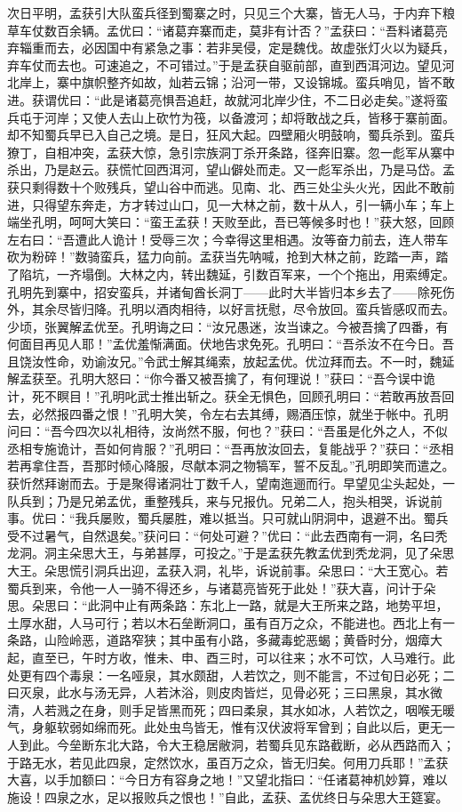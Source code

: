 次日平明，孟获引大队蛮兵径到蜀寨之时，只见三个大寨，皆无人马，于内弃下粮草车仗数百余辆。孟优曰：“诸葛弃寨而走，莫非有计否？”孟获曰：“吾料诸葛亮弃辎重而去，必因国中有紧急之事：若非吴侵，定是魏伐。故虚张灯火以为疑兵，弃车仗而去也。可速追之，不可错过。”于是孟获自驱前部，直到西洱河边。望见河北岸上，寨中旗帜整齐如故，灿若云锦；沿河一带，又设锦城。蛮兵哨见，皆不敢进。获谓优曰：“此是诸葛亮惧吾追赶，故就河北岸少住，不二日必走矣。”遂将蛮兵屯于河岸；又使人去山上砍竹为筏，以备渡河；却将敢战之兵，皆移于寨前面。却不知蜀兵早已入自己之境。是日，狂风大起。四壁厢火明鼓响，蜀兵杀到。蛮兵獠丁，自相冲突，孟获大惊，急引宗族洞丁杀开条路，径奔旧寨。忽一彪军从寨中杀出，乃是赵云。获慌忙回西洱河，望山僻处而走。又一彪军杀出，乃是马岱。孟获只剩得数十个败残兵，望山谷中而逃。见南、北、西三处尘头火光，因此不敢前进，只得望东奔走，方才转过山口，见一大林之前，数十从人，引一辆小车；车上端坐孔明，呵呵大笑曰：“蛮王孟获！天败至此，吾已等候多时也！”获大怒，回顾左右曰：“吾遭此人诡计！受辱三次；今幸得这里相遇。汝等奋力前去，连人带车砍为粉碎！”数骑蛮兵，猛力向前。孟获当先呐喊，抢到大林之前，趷踏一声，踏了陷坑，一齐塌倒。大林之内，转出魏延，引数百军来，一个个拖出，用索缚定。孔明先到寨中，招安蛮兵，并诸甸酋长洞丁——此时大半皆归本乡去了——除死伤外，其余尽皆归降。孔明以酒肉相待，以好言抚慰，尽令放回。蛮兵皆感叹而去。少顷，张翼解孟优至。孔明诲之曰：“汝兄愚迷，汝当谏之。今被吾擒了四番，有何面目再见人耶！”孟优羞惭满面。伏地告求免死。孔明曰：“吾杀汝不在今日。吾且饶汝性命，劝谕汝兄。”令武士解其绳索，放起孟优。优泣拜而去。不一时，魏延解孟获至。孔明大怒曰：“你今番又被吾擒了，有何理说！”获曰：“吾今误中诡计，死不瞑目！”孔明叱武士推出斩之。获全无惧色，回顾孔明曰：“若敢再放吾回去，必然报四番之恨！”孔明大笑，令左右去其缚，赐酒压惊，就坐于帐中。孔明问曰：“吾今四次以礼相待，汝尚然不服，何也？”获曰：“吾虽是化外之人，不似丞相专施诡计，吾如何肯服？”孔明曰：“吾再放汝回去，复能战乎？”获曰：“丞相若再拿住吾，吾那时倾心降服，尽献本洞之物犒军，誓不反乱。”孔明即笑而遣之。获忻然拜谢而去。于是聚得诸洞壮丁数千人，望南迤逦而行。早望见尘头起处，一队兵到；乃是兄弟孟优，重整残兵，来与兄报仇。兄弟二人，抱头相哭，诉说前事。优曰：“我兵屡败，蜀兵屡胜，难以抵当。只可就山阴洞中，退避不出。蜀兵受不过暑气，自然退矣。”获问曰：“何处可避？”优曰：“此去西南有一洞，名曰秃龙洞。洞主朵思大王，与弟甚厚，可投之。”于是孟获先教孟优到秃龙洞，见了朵思大王。朵思慌引洞兵出迎，孟获入洞，礼毕，诉说前事。朵思曰：“大王宽心。若蜀兵到来，令他一人一骑不得还乡，与诸葛亮皆死于此处！”获大喜，问计于朵思。朵思曰：“此洞中止有两条路：东北上一路，就是大王所来之路，地势平坦，土厚水甜，人马可行；若以木石垒断洞口，虽有百万之众，不能进也。西北上有一条路，山险岭恶，道路窄狭；其中虽有小路，多藏毒蛇恶蝎；黄昏时分，烟瘴大起，直至已，午时方收，惟未、申、酉三时，可以往来；水不可饮，人马难行。此处更有四个毒泉：一名哑泉，其水颇甜，人若饮之，则不能言，不过旬日必死；二曰灭泉，此水与汤无异，人若沐浴，则皮肉皆烂，见骨必死；三曰黑泉，其水微清，人若溅之在身，则手足皆黑而死；四曰柔泉，其水如冰，人若饮之，咽喉无暖气，身躯软弱如绵而死。此处虫鸟皆无，惟有汉伏波将军曾到；自此以后，更无一人到此。今垒断东北大路，令大王稳居敝洞，若蜀兵见东路截断，必从西路而入；于路无水，若见此四泉，定然饮水，虽百万之众，皆无归矣。何用刀兵耶！”孟获大喜，以手加额曰：“今日方有容身之地！”又望北指曰：“任诸葛神机妙算，难以施设！四泉之水，足以报败兵之恨也！”自此，孟获、孟优终日与朵思大王筵宴。

